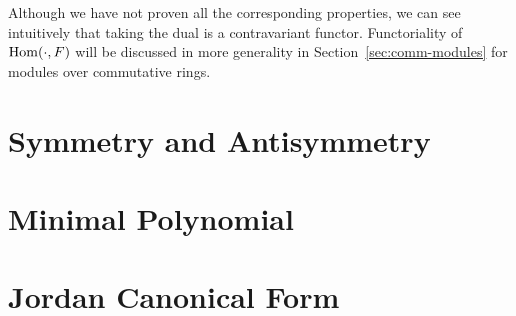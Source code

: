 \begin{remark}
    Although we have not proven all the corresponding properties,
    we can see intuitively that taking the dual is a contravariant functor.
    Functoriality of \(\operatorname{Hom}(\cdot,F)\) will be discussed in more generality
    in Section~\ref{sec:comm-modules} for modules over commutative rings.
\end{remark}
    


\section{Symmetry and Antisymmetry}


\section{Minimal Polynomial}


\section{Jordan Canonical Form}

